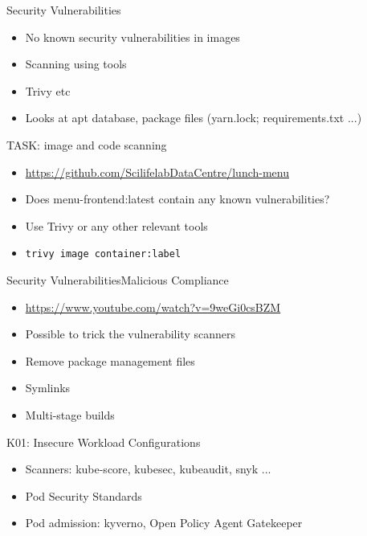 \documentclass{dcpresentation}
\begin{document}
\begin{frame}{Security Vulnerabilities}
 \begin{itemize}
  \item No known security vulnerabilities in images
  \item Scanning using tools
  \item Trivy etc
  \item Looks at apt database, package files (yarn.lock; requirements.txt ...)
 \end{itemize}  
\end{frame}


% 

\begin{frame}{TASK: image and code scanning}
 \begin{itemize}
  \item \url{https://github.com/ScilifelabDataCentre/lunch-menu}
  \item Does menu-frontend:latest contain any known vulnerabilities?
  \item Use Trivy or any other relevant tools
  \item \texttt{trivy image container:label}
 \end{itemize}
\end{frame}


\begin{frame}{Security Vulnerabilities}{Malicious Compliance}
 \begin{itemize}
  \item \url{https://www.youtube.com/watch?v=9weGi0csBZM}
  \item Possible to trick the vulnerability scanners
  \item Remove package management files
  \item Symlinks
  \item Multi-stage builds
 \end{itemize}  
\end{frame}


\begin{frame}{K01: Insecure Workload Configurations}
 \begin{itemize}
  \item Scanners: kube-score, kubesec, kubeaudit, snyk ...
  \item Pod Security Standards
  \item Pod admission: kyverno, Open Policy Agent Gatekeeper
 \end{itemize}
\end{frame}
\end{document}
